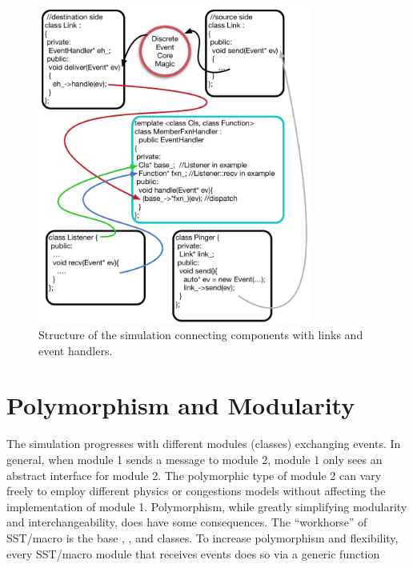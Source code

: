 \begin{figure}
\centering
\includegraphics[width=0.8\textwidth]{figures/EventHandler}
\caption{Structure of the simulation connecting components with links and event handlers.}
\label{fig:abstractHandlers}
\end{figure}

\section{Polymorphism and Modularity}
\label{sec:polymorphism}

The simulation progresses with different modules (classes) exchanging events.
In general, when module 1 sends a message to module 2, module 1 only sees an abstract interface for module 2.
The polymorphic type of module 2 can vary freely to employ different physics or congestions models without affecting the implementation of module 1. 
Polymorphism, while greatly simplifying modularity and interchangeability, does have some consequences.
The ``workhorse'' of SST/macro is the base , , and  classes.
To increase polymorphism and flexibility, every SST/macro module that receives events does so via a generic function

